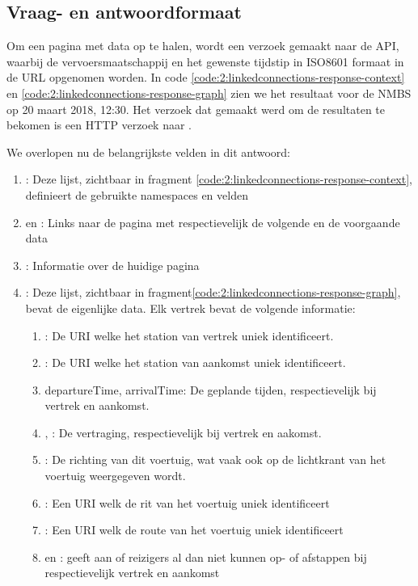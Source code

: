 \subsection{Vraag- en antwoordformaat}
Om een pagina met data op te halen, wordt een verzoek gemaakt naar de API, waarbij de vervoersmaatschappij en het gewenste tijdstip in ISO8601 formaat in de URL opgenomen worden. In code \ref{code:2:linkedconnections-response-context} en \ref{code:2:linkedconnections-response-graph} zien we het resultaat voor de NMBS op 20 maart 2018, 12:30. Het verzoek dat gemaakt werd om de resultaten te bekomen is een HTTP verzoek naar .

We overlopen nu de belangrijkste velden in dit antwoord:
\begin{enumerate}
	\item {}: Deze lijst, zichtbaar in fragment \ref{code:2:linkedconnections-response-context}, definieert de gebruikte namespaces en velden
	\item {} en  : Links naar de pagina met respectievelijk de volgende en de voorgaande data
	\item {}: Informatie over de huidige pagina
	\item {}: Deze lijst, zichtbaar in fragment\ref{code:2:linkedconnections-response-graph},  bevat de eigenlijke data. Elk vertrek bevat de volgende informatie:
	\begin{enumerate}
			\item {}: De URI welke het station van vertrek uniek identificeert.
			\item {}: De URI welke het station van aankomst uniek identificeert.	\item departureTime, arrivalTime: De geplande tijden, respectievelijk bij vertrek en aankomst.
			\item {}, : De vertraging, respectievelijk bij vertrek en aakomst.
			\item {}: De richting van dit voertuig, wat vaak ook op de lichtkrant van het voertuig weergegeven wordt.
			\item {}: Een URI welk de rit van het voertuig uniek identificeert
			\item {}: Een URI welk de route van het voertuig uniek identificeert
			\item {} en : geeft aan of reizigers al dan niet kunnen op- of afstappen bij respectievelijk vertrek en aankomst
	\end{enumerate}
\end{enumerate}

